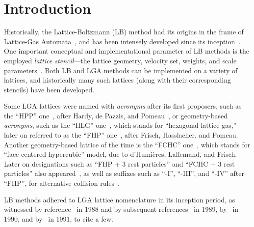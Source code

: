 \section{Introduction}

    Historically,   the   Lattice-Boltzmann   (LB)    method    had    its    origins    in    the    frame    of    Lattice-Gas
    Automata~\cite{1988-McNamaraGR+ZanettiG-PhysRevLett},     and     has     been     intensely     developed     since     its
    inception~\cite{2018-KrugerT+ViggenEM-Springer}. One important conceptual and implementational parameter of  LB  methods  is
    the    employed    \emph{lattice    stencil}---the    lattice    geometry,    velocity    set,    weights,     and     scale
    parameters~\cite{2013-HegeleJr+PhilippiPC-JSciComput,                                2013-MattilaKK+PhilippiPC-IntJModPhysC,
    2014-MattilaKK+PhilippiPC-SciWorldJ}. Both LB and LGA methods can be implemented on a variety of lattices, and  historically
    many such lattices (along with their corresponding stencils) have been developed.

    Some   LGA   lattices   were   named   with   \emph{acronyms}   after   its   first   proposers,   such   as   the   ``HPP''
    one~\cite{1986-FrischU+PomeauY-PhysRevLett},  after  Hardy,  de  Pazzis,   and   Pomeau~\cite{1973-HardyJ+PazzisO-JMathPhys,
    1976-HardyJ+PomeauY-PhysRevA,  1987-SucciS-JPhysAMathGen},  or  geometry-based  \emph{acronyms},   such   as   the   ``HLG''
    one~\cite{1986-FrischU+PomeauY-PhysRevLett}, which stands for ``hexagonal lattice gas,'' later on referred to as the ``FHP''
    one~\cite{1987-FrischU+RivetJP-ComplexSyst,  1987-SucciS-JPhysAMathGen},  after  Frisch,  Hasslacher,  and  Pomeau.  Another
    geometry-based  lattice  of  the  time  is  the  ``FCHC''  one~\cite{1987-FrischU+RivetJP-ComplexSyst},  which  stands   for
    ``face-centered-hypercubic'' model, due to d'Humières, Lallemand, and Frisch. Later on designations such as ``FHP +  3  rest
    particles'' and ``FCHC + 3 rest particles'' also appeared~\cite{1991-BoonJP-PhysD}, as well  as  suffixes  such  as  ``-I'',
    ``-III'', and ``-IV'' after ``FHP'', for alternative collision  rules~\cite{1991-AppertC+ZaleskiS-PhysD,  1991-BoonJP-PhysD,
    1991-ChenS+RoseH-PhysD}.

    LB   methods   adhered    to    LGA    lattice    nomenclature    in    its    inception    period,    as    witnessed    by
    reference~\cite{1988-McNamaraGR+ZanettiG-PhysRevLett}          in          1988          and          by          subsequent
    references~\cite{1989-HigueraFJ+JimenezJ-EurophysLett,         1989-HigueraFJ+SucciS-EurophysLett}         in          1989,
    by~\cite{1990-BenziR+VergassolaM-EurophysLett,   1990-BenziR+VergassolaM-NuclPhysB,    1990-CancelliereA+SucciS-PhysFluidsA,
    1990-VergassolaM+SucciS-EurophysLett}   in   1990,   and   by~\cite{1991-CornubertR+LevermoreD-PhysD,    1991-ErnstMH-PhysD,
    1991-FrischU-PhysD, 1991-GunstensenAK+ZanettiG-PhysRevA, 1991-SucciS+BenziR-PhysRevA} in 1991, to cite a few.

